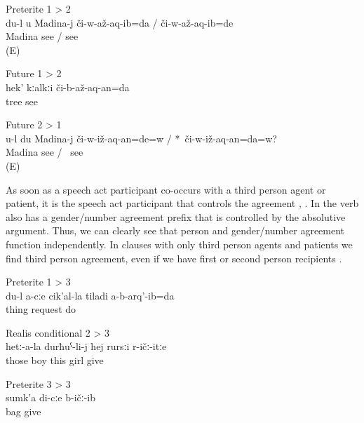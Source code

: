 %
\begin{exe}
		\ex	Preterite 1 > 2\\	\label{ex:‎‎‎I showed you to Madina PT12}
		\gll	du-l	u	Madina-j	či-w-až-aq-ib=da	/	či-w-až-aq-ib=de\\
					Madina	see / see \\
		\glt	{} (E)

		\ex	Future 1 > 2\\	\label{ex:(I) will show (you) the tree FT12}
		\gll	hek'	kːalkːi	či-b-až-aq-an=da\\
				tree	see\\
		\glt	{}

		\ex	Future 2 > 1\\	\label{ex:‎Will you show me to Madina FT21}
		\gll	u-l	du	Madina-j	či-w-iž-aq-an=de=w /	 {*}~či-w-iž-aq-an=da=w?\\
					Madina	see	/	{\hphantom{*}}~see\\
		\glt	{} (E)
\end{exe}

As soon as a speech act participant co-occurs with a third person agent or patient, it is the speech act participant that controls the agreement , . In  the verb also has a gender/number agreement prefix that is controlled by the absolutive argument. Thus, we can clearly see that person and gender/number agreement function independently. In clauses with only third person agents and patients we find third person agreement, even if we have first or second person recipients .
%
\begin{exe}
		\ex	Preterite 1 > 3\\		\label{ex:I did not ask you anything PT13}
		\gll	du-l	a-cːe	cik'al-la	tiladi	a-b-arq'-ib=da\\
					thing	request	do\\
		\glt	{}

		\ex	Realis conditional 2 > 3\\	\label{ex:‎‎if you give the girl to their son RC23}
		\gll	hetː-a-la	durħuˁ-li-j	hej	rursːi	r-ičː-itːe\\
			those	boy	this	girl	give\\
		\glt	{}

		\ex	Preterite 3 > 3\\		\label{ex:(He) gave me his bag PT33}
		\gll	sumk'a	di-cːe	b-ičː-ib\\
			bag		give\\
		\glt	{}
\end{exe}
%


